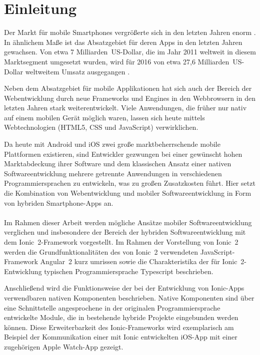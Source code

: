 \chapter{Einleitung}
%
Der Markt für mobile Smartphones vergrößerte sich in den letzten Jahren enorm \cite{ChaffeyMarketStatisticsUsageAndAdoption}. In ähnlichem Maße ist das Absatzgebiet für deren Apps in den letzten Jahren gewachsen. Von etwa 7 Milliarden~US-Dollar, die im Jahr 2011 weltweit in diesem Marktsegment umgesetzt wurden, wird für 2016 von etwa 27,6 Milliarden~US-Dollar weltweitem Umsatz ausgegangen \cite{StatistaGlobalRvenues}.

Neben dem Absatzgebiet für mobile Applikationen hat sich auch der Bereich der Webentwicklung durch neue Frameworks und Engines in den Webbrowsern in den letzten Jahren stark weiterentwickelt. Viele Anwendungen, die früher nur nativ auf einem mobilen Gerät möglich waren, lassen sich heute mittels Webtechnologien (HTML5, CSS und JavaScript) verwirklichen.

Da heute mit Android und iOS zwei große marktbeherrschende mobile Plattformen existieren, sind Entwickler gezwungen bei einer gewünscht hohen Marktabdeckung ihrer Software und dem klassischen Ansatz einer nativen Softwareentwicklung mehrere getrennte Anwendungen in verschiedenen Programmiersprachen zu entwickeln, was zu großen Zusatzkosten führt. Hier setzt die Kombination von Webentwicklung und mobiler Softwareentwicklung in Form von hybriden Smartphone-Apps an.
\\
\\
Im Rahmen dieser Arbeit werden mögliche Ansätze mobiler Softwareentwicklung verglichen und insbesondere der Bereich der hybriden Softwareentwicklung mit dem Ionic~2-Framework vorgestellt.
Im Rahmen der Vorstellung von Ionic~2 werden die Grundfunktionalitäten des von Ionic~2 verwendeten JavaScript-Framework Angular~2 kurz umrissen sowie die Charakteristika der für Ionic~2-Entwicklung typischen Programmiersprache Typescript beschrieben.

Anschließend wird die Funktionsweise der bei der Entwicklung von Ionic-Apps verwendbaren nativen Komponenten beschrieben. Native Komponenten sind über eine Schnittstelle angesprochene in der originalen Programmiersprache entwickelte Module, die in bestehende hybride Projekte eingebunden werden können. Diese Erweiterbarkeit des Ionic-Frameworks wird exemplarisch am Beispiel der Kommunikation einer mit Ionic entwickelten iOS-App mit einer zugehörigen Apple Watch-App gezeigt.
